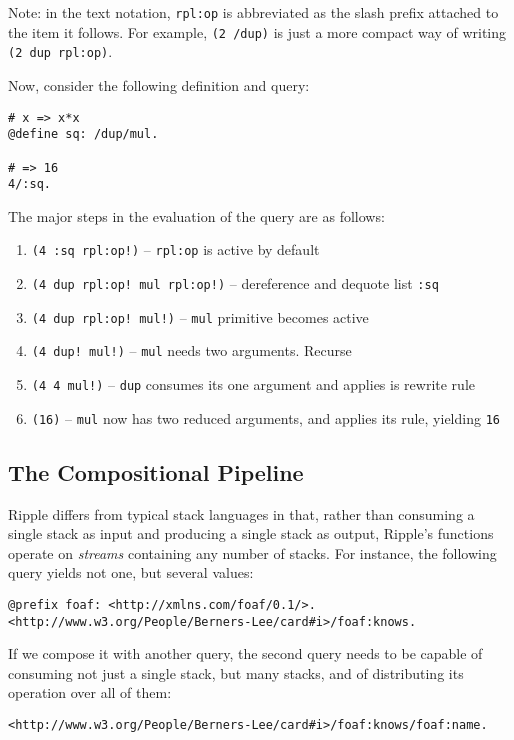 \documentclass[runningheads]{llncs}
\begin{document}
Note: in the text notation, \texttt{rpl:op} is abbreviated as the slash prefix attached to the item it follows.  For example, \texttt{(2 /dup)} is just a more compact way of writing \texttt{(2 dup rpl:op)}.

Now, consider the following definition and query:

\begin{verbatim}
# x => x*x
@define sq: /dup/mul.

# => 16
4/:sq.
\end{verbatim}
The major steps in the evaluation of the query are as follows:
\begin{enumerate}
\item \texttt{(4 :sq rpl:op!)} -- \texttt{rpl:op} is active by default
\item \texttt{(4 dup rpl:op! mul rpl:op!)} -- dereference and dequote list \texttt{:sq}
\item \texttt{(4 dup rpl:op! mul!)} -- \texttt{mul} primitive becomes active
\item \texttt{(4 dup! mul!)} -- \texttt{mul} needs two arguments.  Recurse
\item \texttt{(4 4 mul!)} -- \texttt{dup} consumes its one argument and applies is rewrite rule
\item \texttt{(16)} -- \texttt{mul} now has two reduced arguments, and applies its rule, yielding \texttt{16}
\end{enumerate}

\subsection{The Compositional Pipeline}

Ripple differs from typical stack languages in that, rather than consuming a single stack as input and producing a single stack as output, Ripple's functions operate on \textit{streams} containing any number of stacks.  For instance, the following query yields not one, but several values:
\begin{verbatim}
@prefix foaf: <http://xmlns.com/foaf/0.1/>.
<http://www.w3.org/People/Berners-Lee/card#i>/foaf:knows.
\end{verbatim}

If we compose it with another query, the second query needs to be capable of consuming not just a single stack, but many stacks, and of distributing its operation over all of them:
\begin{verbatim}
<http://www.w3.org/People/Berners-Lee/card#i>/foaf:knows/foaf:name.
\end{verbatim}
\end{document}
